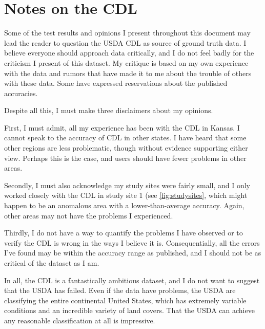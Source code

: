 \chapter{Notes on the CDL}
\label{appendix:cdl}

Some of the test results and opinions I present throughout this document may lead the reader to question the USDA CDL as source of ground truth data. I believe everyone should approach data critically, and I do not feel badly for the criticism I present of this dataset. My critique is based on my own experience with the data and rumors that have made it to me about the trouble of others with these data. Some have expressed reservations about the published accuracies.


Despite all this, I must make three disclaimers about my opinions.

First, I must admit, all my experience has been with the CDL in Kansas. I cannot speak to the accuracy of CDL in other states. I have heard that some other regions are less problematic, though without evidence supporting either view. Perhaps this is the case, and users should have fewer problems in other areas.

Secondly, I must also acknowledge my study sites were fairly small, and I only worked closely with the CDL in study site 1 (see \cref{fig:studysites}, which might happen to be an anomalous area with a lower-than-average accuracy. Again, other areas may not have the problems I experienced.

Thirdly, I do not have a way to quantify the problems I have observed or to verify the CDL is wrong in the ways I believe it is. Consequentially, all the errors I've found may be within the accuracy range as published, and I should not be as critical of the dataset as I am.

In all, the CDL is a fantastically ambitious dataset, and I do not want to suggest that the USDA has failed. Even if the data have problems, the USDA are classifying the entire continental United States, which has extremely variable conditions and an incredible variety of land covers. That the USDA can achieve any reasonable classification at all is impressive.